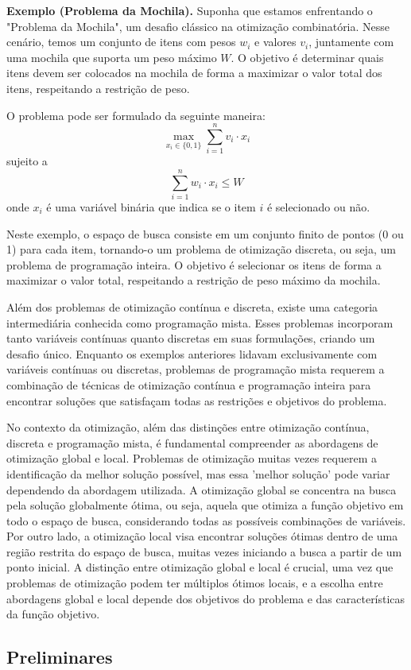\textbf{Exemplo (Problema da Mochila).} Suponha que estamos enfrentando o "Problema da Mochila", um desafio clássico na otimização combinatória. Nesse cenário, temos um conjunto de itens com pesos $w_i$ e valores $v_i$, juntamente com uma mochila que suporta um peso máximo $W$. O objetivo é determinar quais itens devem ser colocados na mochila de forma a maximizar o valor total dos itens, respeitando a restrição de peso.

O problema pode ser formulado da seguinte maneira:
$$\max_{x_i \in \{0, 1\}} \sum_{i=1}^{n} v_i \cdot x_i$$
sujeito a
$$\sum_{i=1}^{n} w_i \cdot x_i \leq W$$
onde $x_i$ é uma variável binária que indica se o item $i$ é selecionado ou não.

Neste exemplo, o espaço de busca consiste em um conjunto finito de pontos (0 ou 1) para cada item, tornando-o um problema de otimização discreta, ou seja, um problema de programação inteira. O objetivo é selecionar os itens de forma a maximizar o valor total, respeitando a restrição de peso máximo da mochila.

Além dos problemas de otimização contínua e discreta, existe uma categoria intermediária conhecida como programação mista. Esses problemas incorporam tanto variáveis contínuas quanto discretas em suas formulações, criando um desafio único. Enquanto os exemplos anteriores lidavam exclusivamente com variáveis contínuas ou discretas, problemas de programação mista requerem a combinação de técnicas de otimização contínua e programação inteira para encontrar soluções que satisfaçam todas as restrições e objetivos do problema.

No contexto da otimização, além das distinções entre otimização contínua, discreta e programação mista, é fundamental compreender as abordagens de otimização global e local. Problemas de otimização muitas vezes requerem a identificação da melhor solução possível, mas essa 'melhor solução' pode variar dependendo da abordagem utilizada. A otimização global se concentra na busca pela solução globalmente ótima, ou seja, aquela que otimiza a função objetivo em todo o espaço de busca, considerando todas as possíveis combinações de variáveis. Por outro lado, a otimização local visa encontrar soluções ótimas dentro de uma região restrita do espaço de busca, muitas vezes iniciando a busca a partir de um ponto inicial. A distinção entre otimização global e local é crucial, uma vez que problemas de otimização podem ter múltiplos ótimos locais, e a escolha entre abordagens global e local depende dos objetivos do problema e das características da função objetivo.

\subsection{Preliminares}


